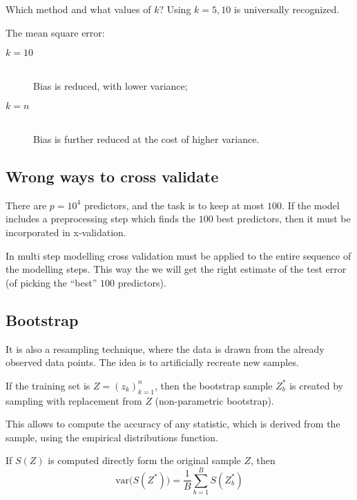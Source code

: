 \documentclass[a4paper]{article}
\newcommand{\brac}[1]{{\left ( #1 \right )}}
\newcommand{\var}[0]{{\text{var}}}
\begin{document}
Which method and what values of $k$? Using $k=5,10$ is universally recognized.

The mean square error:
\begin{description}
	\item[$k=10$] \hfill\\
		Bias is reduced, with lower variance;
	\item[$k=n$] \hfill\\
		Bias is further reduced at the cost of higher variance.
\end{description}


\subsection{Wrong ways to cross validate} %
\label{sub:wrong_ways_to_cross_validate}

There are $p=10^4$ predictors, and the task is to keep at most $100$. If the model includes a preprocessing step which finds the $100$ best predictors, then it must be incorporated in x-validation.

In multi step modelling cross validation must be applied to the entire sequence of the modelling steps. This way the we will get the right estimate of the test error (of picking the ``best'' $100$ predictors).



\subsection{Bootstrap} %
\label{sub:bootstrap}

It is also a resampling technique, where the data is drawn from the already observed data points. The idea is to artificially recreate new samples.

If the training set is $Z=\brac{z_k}_{k=1}^n$, then the bootstrap sample $Z^*_b$ is created by sampling with replacement from $Z$ (non-parametric bootstrap).

This allows to compute the accuracy of any statistic, which is derived from the sample, using the empirical distributions function.

If $S(Z)$ is computed directly form the original sample $Z$, then 
\[\var\big(S(Z^*)\big) = \frac{1}{B}\sum_{b=1}^B S(Z^*_b)\]
\end{document}
